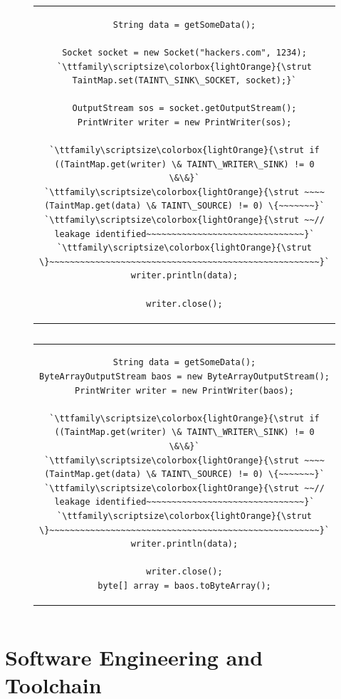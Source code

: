 \documentclass[12pt,twoside,notitlepage]{report}
\newcommand{\highlight}[1]{\colorbox{lightOrange}{\strut #1}}
\newcommand{\lsthl}[1] {\ttfamily\scriptsize\highlight{#1}}
\begin{document}
\begin{figure}[h]
	\centering
	\begin{tabular}{c}
	\begin{lstlisting}
String data = getSomeData();

Socket socket = new Socket("hackers.com", 1234);
`\lsthl{TaintMap.set(TAINT\_SINK\_SOCKET, socket);}`

OutputStream sos = socket.getOutputStream();
PrintWriter writer = new PrintWriter(sos);

`\lsthl{if ((TaintMap.get(writer) \& TAINT\_WRITER\_SINK) != 0 \&\&}`
`\lsthl{~~~~(TaintMap.get(data) \& TAINT\_SOURCE) != 0) \{~~~~~~~}`
`\lsthl{~~// leakage identified~~~~~~~~~~~~~~~~~~~~~~~~~~~~~~~}`
`\lsthl{\}~~~~~~~~~~~~~~~~~~~~~~~~~~~~~~~~~~~~~~~~~~~~~~~~~~~~~}`
writer.println(data);

writer.close();
	\end{lstlisting}
	\end{tabular}
	\begin{lstlisting}[caption={Writer interface used for network communication, with sink instrumentation},
	                   label={listing:Sink_Socket}]
	\end{lstlisting}
\end{figure}

\begin{figure}[h]
	\centering
	\begin{tabular}{c}
	\begin{lstlisting}
String data = getSomeData();
ByteArrayOutputStream baos = new ByteArrayOutputStream();
PrintWriter writer = new PrintWriter(baos);

`\lsthl{if ((TaintMap.get(writer) \& TAINT\_WRITER\_SINK) != 0 \&\&}`
`\lsthl{~~~~(TaintMap.get(data) \& TAINT\_SOURCE) != 0) \{~~~~~~~}`
`\lsthl{~~// leakage identified~~~~~~~~~~~~~~~~~~~~~~~~~~~~~~~}`
`\lsthl{\}~~~~~~~~~~~~~~~~~~~~~~~~~~~~~~~~~~~~~~~~~~~~~~~~~~~~~}`
writer.println(data);

writer.close();
byte[] array = baos.toByteArray();
	\end{lstlisting}
	\end{tabular}
	\begin{lstlisting}[caption={Writer interface used to turn data into a byte array, with sink instrumentation},
	                   label={listing:Sink_ByteArray}]
	\end{lstlisting}
\end{figure}

\section{Software Engineering and Toolchain}
\end{document}

